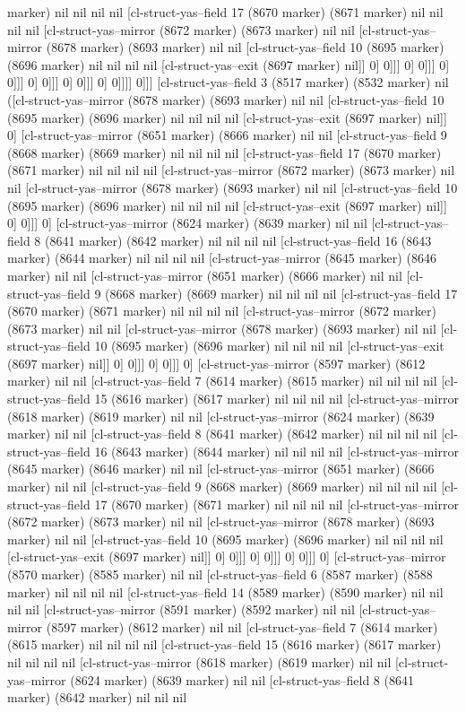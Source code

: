 {{marker) nil nil nil nil [cl-struct-yas--field 17 (8670 marker) (8671 marker) nil nil nil nil [cl-struct-yas--mirror (8672 marker) (8673 marker) nil nil [cl-struct-yas--mirror (8678 marker) (8693 marker) nil nil [cl-struct-yas--field 10 (8695 marker) (8696 marker) nil nil nil nil [cl-struct-yas--exit (8697 marker) nil]] 0] 0]]] 0] 0]]] 0] 0]]] 0] 0]]] 0] 0]]] 0] 0]]]] 0]]] [cl-struct-yas--field 3 (8517 marker) (8532 marker) nil ([cl-struct-yas--mirror (8678 marker) (8693 marker) nil nil [cl-struct-yas--field 10 (8695 marker) (8696 marker) nil nil nil nil [cl-struct-yas--exit (8697 marker) nil]] 0] [cl-struct-yas--mirror (8651 marker) (8666 marker) nil nil [cl-struct-yas--field 9 (8668 marker) (8669 marker) nil nil nil nil [cl-struct-yas--field 17 (8670 marker) (8671 marker) nil nil nil nil [cl-struct-yas--mirror (8672 marker) (8673 marker) nil nil [cl-struct-yas--mirror (8678 marker) (8693 marker) nil nil [cl-struct-yas--field 10 (8695 marker) (8696 marker) nil nil nil nil [cl-struct-yas--exit (8697 marker) nil]] 0] 0]]] 0] [cl-struct-yas--mirror (8624 marker) (8639 marker) nil nil [cl-struct-yas--field 8 (8641 marker) (8642 marker) nil nil nil nil [cl-struct-yas--field 16 (8643 marker) (8644 marker) nil nil nil nil [cl-struct-yas--mirror (8645 marker) (8646 marker) nil nil [cl-struct-yas--mirror (8651 marker) (8666 marker) nil nil [cl-struct-yas--field 9 (8668 marker) (8669 marker) nil nil nil nil [cl-struct-yas--field 17 (8670 marker) (8671 marker) nil nil nil nil [cl-struct-yas--mirror (8672 marker) (8673 marker) nil nil [cl-struct-yas--mirror (8678 marker) (8693 marker) nil nil [cl-struct-yas--field 10 (8695 marker) (8696 marker) nil nil nil nil [cl-struct-yas--exit (8697 marker) nil]] 0] 0]]] 0] 0]]] 0] [cl-struct-yas--mirror (8597 marker) (8612 marker) nil nil [cl-struct-yas--field 7 (8614 marker) (8615 marker) nil nil nil nil [cl-struct-yas--field 15 (8616 marker) (8617 marker) nil nil nil nil [cl-struct-yas--mirror (8618 marker) (8619 marker) nil nil [cl-struct-yas--mirror (8624 marker) (8639 marker) nil nil [cl-struct-yas--field 8 (8641 marker) (8642 marker) nil nil nil nil [cl-struct-yas--field 16 (8643 marker) (8644 marker) nil nil nil nil [cl-struct-yas--mirror (8645 marker) (8646 marker) nil nil [cl-struct-yas--mirror (8651 marker) (8666 marker) nil nil [cl-struct-yas--field 9 (8668 marker) (8669 marker) nil nil nil nil [cl-struct-yas--field 17 (8670 marker) (8671 marker) nil nil nil nil [cl-struct-yas--mirror (8672 marker) (8673 marker) nil nil [cl-struct-yas--mirror (8678 marker) (8693 marker) nil nil [cl-struct-yas--field 10 (8695 marker) (8696 marker) nil nil nil nil [cl-struct-yas--exit (8697 marker) nil]] 0] 0]]] 0] 0]]] 0] 0]]] 0] [cl-struct-yas--mirror (8570 marker) (8585 marker) nil nil [cl-struct-yas--field 6 (8587 marker) (8588 marker) nil nil nil nil [cl-struct-yas--field 14 (8589 marker) (8590 marker) nil nil nil nil [cl-struct-yas--mirror (8591 marker) (8592 marker) nil nil [cl-struct-yas--mirror (8597 marker) (8612 marker) nil nil [cl-struct-yas--field 7 (8614 marker) (8615 marker) nil nil nil nil [cl-struct-yas--field 15 (8616 marker) (8617 marker) nil nil nil nil [cl-struct-yas--mirror (8618 marker) (8619 marker) nil nil [cl-struct-yas--mirror (8624 marker) (8639 marker) nil nil [cl-struct-yas--field 8 (8641 marker) (8642 marker) nil nil nil }}
